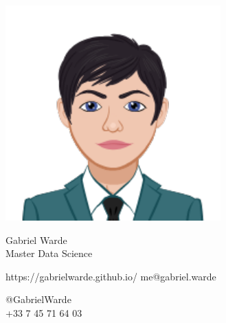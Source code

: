 \documentclass{article}
\begin{document}
\centering \includegraphics[width=.20\linewidth]{logo}\\[5pt]
\parbox{2in}{\Large \centering Gabriel Warde\\[1pt]
\normalsize Master Data Science}

\vfill
\raggedright
\begin{multicols}{2}
https://gabrielwarde.github.io/
me@gabriel.warde

\columnbreak
\raggedleft
@GabrielWarde\\
+33 7 45 71 64 03%
\end{multicols}%
\end{document}
